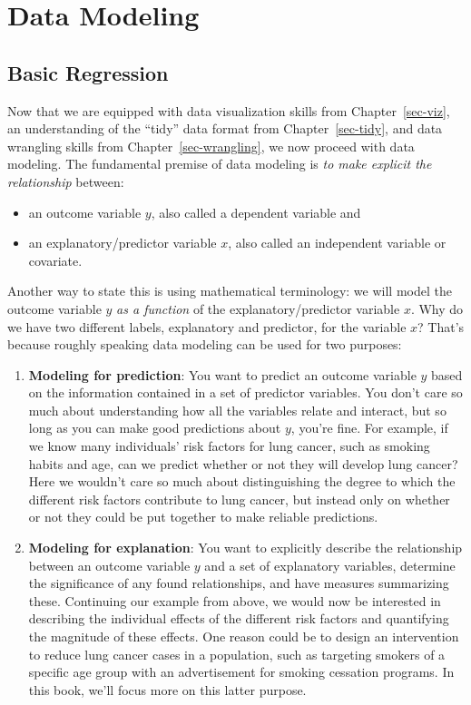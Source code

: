 \documentclass[
  letterpaper,
  DIV=11,
  numbers=noendperiod]{scrreprt}
\providecommand{\tightlist}{%
  \setlength{\itemsep}{0pt}\setlength{\parskip}{0pt}}\usepackage{longtable,booktabs,array}
\theoremstyle{definition}
\theoremstyle{remark}
\begin{document}
\part{Data Modeling}

\hypertarget{sec-regression}{%
\chapter{Basic Regression}\label{sec-regression}}

Now that we are equipped with data visualization skills from
Chapter~\ref{sec-viz}, an understanding of the ``tidy'' data format from
Chapter~\ref{sec-tidy}, and data wrangling skills from
Chapter~\ref{sec-wrangling}, we now proceed with data modeling. The
fundamental premise of data modeling is \emph{to make explicit the
relationship} between:

\begin{itemize}
\tightlist
\item
  an outcome variable \(y\), also called a dependent variable and
\item
  an explanatory/predictor variable \(x\), also called an independent
  variable or covariate.
\end{itemize}

Another way to state this is using mathematical terminology: we will
model the outcome variable \(y\) \emph{as a function} of the
explanatory/predictor variable \(x\). Why do we have two different
labels, explanatory and predictor, for the variable \(x\)? That's
because roughly speaking data modeling can be used for two purposes:

\begin{enumerate}
\def\labelenumi{\arabic{enumi}.}
\item
  \textbf{Modeling for prediction}: You want to predict an outcome
  variable \(y\) based on the information contained in a set of
  predictor variables. You don't care so much about understanding how
  all the variables relate and interact, but so long as you can make
  good predictions about \(y\), you're fine. For example, if we know
  many individuals' risk factors for lung cancer, such as smoking habits
  and age, can we predict whether or not they will develop lung cancer?
  Here we wouldn't care so much about distinguishing the degree to which
  the different risk factors contribute to lung cancer, but instead only
  on whether or not they could be put together to make reliable
  predictions.
\item
  \textbf{Modeling for explanation}: You want to explicitly describe the
  relationship between an outcome variable \(y\) and a set of
  explanatory variables, determine the significance of any found
  relationships, and have measures summarizing these. Continuing our
  example from above, we would now be interested in describing the
  individual effects of the different risk factors and quantifying the
  magnitude of these effects. One reason could be to design an
  intervention to reduce lung cancer cases in a population, such as
  targeting smokers of a specific age group with an advertisement for
  smoking cessation programs. In this book, we'll focus more on this
  latter purpose.
\end{enumerate}
\end{document}
